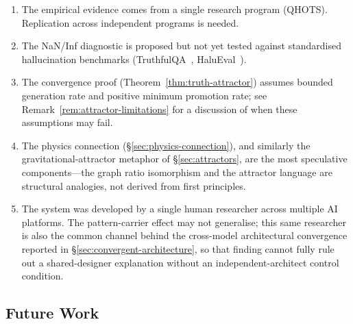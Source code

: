\documentclass[11pt]{article}
\theoremstyle{definition}
\theoremstyle{remark}
\begin{document}
\begin{enumerate}
  \item The empirical evidence comes from a single research program (QHOTS).
    Replication across independent programs is needed.
  \item The NaN/Inf diagnostic is proposed but not yet tested against standardised
    hallucination benchmarks (TruthfulQA~\cite{lin2022truthfulqa},
    HaluEval~\cite{li2023halueval}).
  \item The convergence proof (Theorem~\ref{thm:truth-attractor}) assumes
    bounded generation rate and positive minimum promotion rate; see
    Remark~\ref{rem:attractor-limitations} for a discussion of when these
    assumptions may fail.
  \item The physics connection (\S\ref{sec:physics-connection}), and similarly
    the gravitational-attractor metaphor of \S\ref{sec:attractors}, are the
    most speculative components---the graph ratio isomorphism and the
    attractor language are structural analogies, not derived from first
    principles.
  \item The system was developed by a single human researcher across multiple AI
    platforms.  The pattern-carrier effect may not generalise; this same
    researcher is also the common channel behind the cross-model architectural
    convergence reported in \S\ref{sec:convergent-architecture}, so that
    finding cannot fully rule out a shared-designer explanation without an
    independent-architect control condition.
\end{enumerate}

\subsection{Future Work}
\label{sec:future-work}
\end{document}
